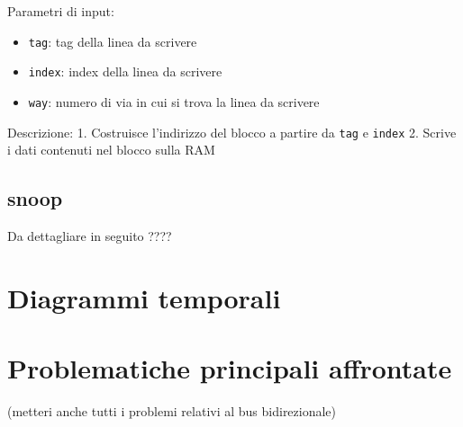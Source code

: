 Parametri di input:
\begin{itemize}
  \item \texttt{tag}: tag della linea da scrivere
  \item \texttt{index}: index della linea da scrivere
  \item \texttt{way}: numero di via in cui si trova la linea da scrivere
\end{itemize}

Descrizione:
	1. Costruisce l'indirizzo del blocco a partire da \texttt{tag} e \texttt{index}
	2. Scrive i dati contenuti nel blocco sulla RAM
	

\subsection{snoop}
	Da dettagliare in seguito ????
	

\section{Diagrammi temporali}

\section{Problematiche principali affrontate}

(metteri anche tutti i problemi relativi al bus bidirezionale)\\

